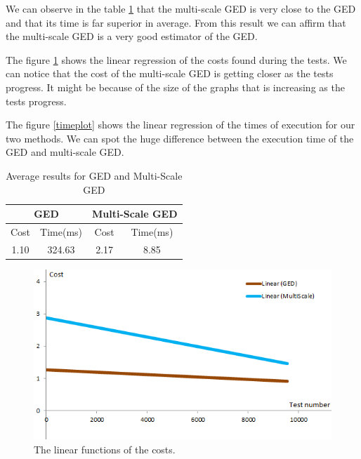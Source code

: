 \documentclass[UTF8, twoside]{EPURapport}
\begin{document}
	We can observe in the table \ref{tab:averageResults} that the multi-scale GED is very close to the GED and that its time is far superior in average. From this result we can affirm that the multi-scale GED is a very good estimator of the GED.
	
	The figure \ref{costplot} shows the linear regression of the costs found during the tests. We can notice that the cost of the multi-scale GED is getting closer as the tests progress. It might be because of the size of the graphs that is increasing as the tests progress.
	
	The figure \ref{timeplot} shows the linear regression of the times of execution for our two methods. We can spot the huge difference between the execution time of the GED and multi-scale GED.
	
\begin{table}[!h]
\centering
\setlength{\extrarowheight}{1.5pt}
\begin{tabular}{|c|c|c|c|} 
\hline
\multicolumn{2}{|c|}{GED} &  \multicolumn{2}{c|}{Multi-Scale GED}\\
\hline
Cost & Time(ms) & Cost & Time(ms)\\
\hline
1.10 & 324.63 & 2.17 & 8.85\\
\hline
\end{tabular}
\caption{\label{tab:averageResults}Average results for GED and Multi-Scale GED}
\end{table}

\begin{figure} [h]
	\centering \includegraphics{images/GEDvsMultiScalePlot.png}
	\caption {The linear functions of the costs.}	
	\label {costplot}
\end{figure}
\end{document}

